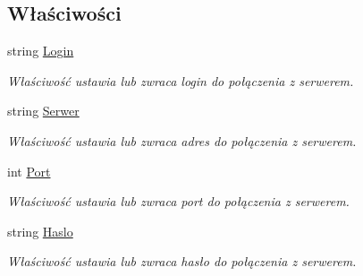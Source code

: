 \subsection*{Właściwości}
\begin{CompactItemize}
\item 
string \hyperlink{a00013_2c321eee82dba3f82cae18a5b4d6d620}{Login}
\begin{CompactList}\small\item\em Właściwość ustawia lub zwraca login do połączenia z serwerem. \item\end{CompactList}\item 
string \hyperlink{a00013_d9eb3fc56fa999cc46116e3d7019f070}{Serwer}
\begin{CompactList}\small\item\em Właściwość ustawia lub zwraca adres do połączenia z serwerem. \item\end{CompactList}\item 
int \hyperlink{a00013_90c9595c1609fb8364d7e2a8d806a27c}{Port}
\begin{CompactList}\small\item\em Właściwość ustawia lub zwraca port do połączenia z serwerem. \item\end{CompactList}\item 
string \hyperlink{a00013_3c5917b1f8a0fb187d3c48ff22b25ec6}{Haslo}
\begin{CompactList}\small\item\em Właściwość ustawia lub zwraca hasło do połączenia z serwerem. \item\end{CompactList}\end{CompactItemize}
